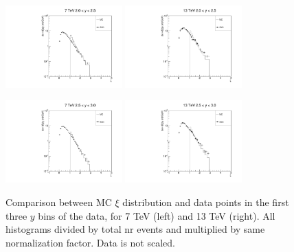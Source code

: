 \documentclass{article}
\begin{document}
\begin{figure}[h!]
\centering
\includegraphics[width = 0.4\textwidth]{xi_7_y3.pdf}
\includegraphics[width = 0.4\textwidth]{xi_13_y3.pdf}

\includegraphics[width = 0.4\textwidth]{xi_7_y4.pdf}
\includegraphics[width = 0.4\textwidth]{xi_13_y4.pdf}
\caption{Comparison between MC $\xi$ distribution and data points in the first three $y$ bins of the data, for 7 TeV (left) and 13 TeV (right). All histograms divided by total nr events and multiplied by same normalization factor. Data is not scaled.}\label{f:xi_comp_2}
\end{figure}

\clearpage
\end{document}
